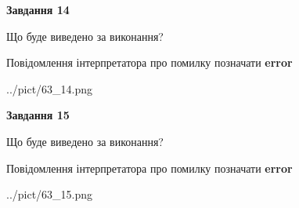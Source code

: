 \documentclass[11pt, ukrainian]{article}
\begin{document}
{\begin {large}
{\begin {center}\textbf{Завдання 14}\end {center}}\par
Що буде виведено за виконання? \par
Повідомлення інтерпретатора про помилку позначати \textbf{error}

\begin{center}
	{../pict/63_14.png}
\end{center}
\newpage

{\begin {center}\textbf{Завдання 15}\end {center}}\par
Що буде виведено за виконання? \par
Повідомлення інтерпретатора про помилку позначати \textbf{error}

\begin{center}
	{../pict/63_15.png}
\end{center}
\newpage

\end {large}}
\end{document}
